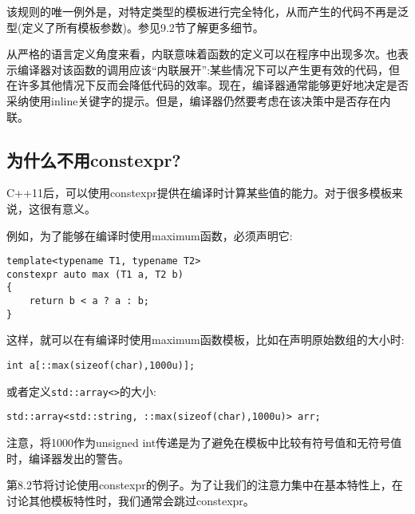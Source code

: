 该规则的唯一例外是，对特定类型的模板进行完全特化，从而产生的代码不再是泛型(定义了所有模板参数)。参见9.2节了解更多细节。
 
从严格的语言定义角度来看，内联意味着函数的定义可以在程序中出现多次。也表示编译器对该函数的调用应该“内联展开”:某些情况下可以产生更有效的代码，但在许多其他情况下反而会降低代码的效率。现在，编译器通常能够更好地决定是否采纳使用inline关键字的提示。但是，编译器仍然要考虑在该决策中是否存在内联。

\subsection{为什么不用constexpr?}

C++11后，可以使用constexpr提供在编译时计算某些值的能力。对于很多模板来说，这很有意义。

例如，为了能够在编译时使用maximum函数，必须声明它:

\begin{lstlisting}[style=styleCXX]
template<typename T1, typename T2>
constexpr auto max (T1 a, T2 b)
{
	return b < a ? a : b;
}
\end{lstlisting}

这样，就可以在有编译时使用maximum函数模板，比如在声明原始数组的大小时:

\begin{lstlisting}[style=styleCXX]
int a[::max(sizeof(char),1000u)];
\end{lstlisting}

或者定义\texttt{std::array<>}的大小:

\begin{lstlisting}[style=styleCXX]
std::array<std::string, ::max(sizeof(char),1000u)> arr;
\end{lstlisting}

注意，将1000作为unsigned int传递是为了避免在模板中比较有符号值和无符号值时，编译器发出的警告。

第8.2节将讨论使用constexpr的例子。为了让我们的注意力集中在基本特性上，在讨论其他模板特性时，我们通常会跳过constexpr。











